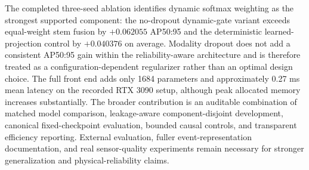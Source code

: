 The completed three-seed ablation identifies dynamic softmax weighting as the strongest supported component: the no-dropout dynamic-gate variant exceeds equal-weight stem fusion by $+0.062055$ AP50:95 and the deterministic learned-projection control by $+0.040376$ on average. Modality dropout does not add a consistent AP50:95 gain within the reliability-aware architecture and is therefore treated as a configuration-dependent regularizer rather than an optimal design choice. The full front end adds only 1684 parameters and approximately 0.27 ms mean latency on the recorded RTX 3090 setup, although peak allocated memory increases substantially. The broader contribution is an auditable combination of matched model comparison, leakage-aware component-disjoint development, canonical fixed-checkpoint evaluation, bounded causal controls, and transparent efficiency reporting. External evaluation, fuller event-representation documentation, and real sensor-quality experiments remain necessary for stronger generalization and physical-reliability claims.
